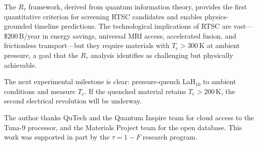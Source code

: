 \documentclass[prl,twocolumn,superscriptaddress,longbibliography,floatfix]{revtex4-2}
\newcommand{\tauasym}{\tau}
\newcommand{\Rtau}{R_{\tauasym}}
\newcommand{\Tc}{T_{\mathrm{c}}}
\begin{document}
The $\Rtau$ framework, derived from quantum information
theory, provides the first quantitative criterion for
screening RTSC candidates and enables physics-grounded
timeline predictions.  The technological implications of RTSC
are vast---\$200\,B/year in energy savings, universal MRI
access, accelerated fusion, and frictionless transport---but
they require materials with $\Tc > 300\,$K at ambient
pressure, a goal that the $\Rtau$ analysis identifies as
challenging but physically achievable.

The next experimental milestone is clear:
pressure-quench LaH$_{10}$ to ambient conditions and measure
$\Tc$.  If the quenched material retains $\Tc > 200\,$K, the
second electrical revolution will be underway.

\begin{acknowledgments}
The author thanks QuTech and the Quantum Inspire team for cloud
access to the Tuna-9 processor, and the Materials Project team
for the open database.  This work was supported in part by
the $\tauasym = 1 - F$ research program.
\end{acknowledgments}
\end{document}
